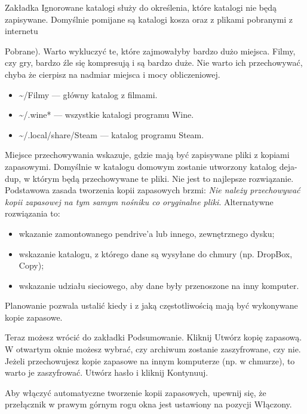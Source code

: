 Zakładka \textcolor{ubuntu_orange}{Ignorowane katalogi} służy do określenia, które katalogi nie będą zapisywane. Domyślnie pomijane są katalogi kosza oraz z plikami pobranymi z internetu {Pobrane). Warto wykluczyć te, które zajmowałyby bardzo dużo miejsca. Filmy, czy gry, bardzo źle się kompresują i są bardzo duże. Nie warto ich przechowywać, chyba że cierpisz na nadmiar miejsca i mocy obliczeniowej.
\begin{itemize}
\item \textcolor{ubuntu_orange}{\textasciitilde /Filmy} --- główny katalog z filmami.
\item \textcolor{ubuntu_orange}{\textasciitilde /.wine*} --- wszystkie katalogi programu Wine.
\item \textcolor{ubuntu_orange}{\textasciitilde /.local/share/Steam} --- katalog programu Steam.
\end{itemize}

\textcolor{ubuntu_orange}{Miejsce przechowywania} wskazuje, gdzie mają być zapisywane pliki z kopiami zapasowymi.  Domyślnie w katalogu domowym zostanie utworzony katalog \textcolor{ubuntu_orange}{deja-dup}, w którym będą przechowywane te pliki. Nie jest to najlepsze rozwiązanie. Podstawowa zasada tworzenia kopii zapasowych brzmi: \emph{Nie należy przechowywać kopii zapasowej na tym samym nośniku co oryginalne pliki}. Alternatywne rozwiązania to:
\begin{itemize}
\item wkazanie zamontowanego pendrive'a lub innego, zewnętrznego dysku;
\item wskazanie katalogu, z którego dane są wysyłane do chmury (np. DropBox, Copy);
\item wskazanie udziału sieciowego, aby dane były przenoszone na inny komputer.
\end{itemize}

\textcolor{ubuntu_orange}{Planowanie} pozwala ustalić kiedy i z jaką częstotliwością mają być wykonywane kopie zapasowe.

Teraz możesz wrócić do zakładki \textcolor{ubuntu_orange}{Podsumowanie}. Kliknij \textcolor{ubuntu_orange}{Utwórz kopię zapasową}. W otwartym oknie możesz wybrać, czy archiwum zostanie zaszyfrowane, czy nie. Jeżeli przechowujesz kopie zapasowe na innym komputerze (np. w chmurze), to warto je zaszyfrować. Utwórz hasło i kliknij \textcolor{ubuntu_orange}{Kontynuuj}.

Aby włączyć automatyczne tworzenie kopii zapasowych, upewnij się, że przełącznik w prawym górnym rogu okna jest ustawiony na pozycji \textcolor{ubuntu_orange}{Włączony}.

}
